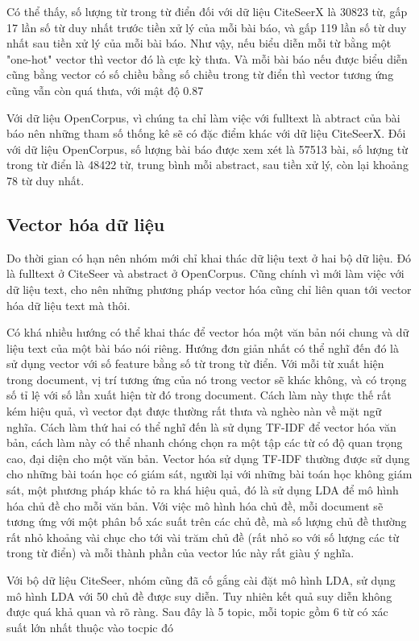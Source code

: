 \documentclass[12pt,a4paper]{article}
\begin{document}
Có thể thấy, số lượng từ trong từ điển đối với dữ liệu CiteSeerX là 30823 từ, gấp 17 lần số từ duy nhất trước tiền xử lý của mỗi bài báo, và gấp 119 lần số từ duy nhất sau tiền xử lý của mỗi bài báo. Như vậy, nếu biểu diễn mỗi từ bằng một "one-hot" vector thì vector đó là cực kỳ thưa. Và mỗi bài báo nếu được biểu diễn cũng bằng vector có số chiều bằng số chiều trong từ điển thì vector tương ứng cũng vẫn còn quá thưa, với mật độ 0.87%


Với dữ liệu OpenCorpus, vì chúng ta chỉ làm việc với fulltext là abtract của bài báo nên những tham số thống kê sẽ có đặc điểm khác với dữ liệu CiteSeerX. Đối với dữ liệu OpenCorpus, số lượng bài báo được xem xét là 57513 bài, số lượng từ trong từ điển là 48422 từ, trung bình mỗi abstract, sau tiền xử lý, còn lại khoảng 78 từ duy nhất.


\subsection{Vector hóa dữ liệu}
Do thời gian có hạn nên nhóm mới chỉ khai thác dữ liệu text ở hai bộ dữ liệu. Đó là fulltext ở CiteSeer và abstract ở OpenCorpus. Cũng chính vì mới làm việc với dữ liệu text, cho nên những phương pháp vector hóa cũng chỉ liên quan tới vector hóa dữ liệu text mà thôi.


Có khá nhiều hướng có thể khai thác để vector hóa một văn bản nói chung và dữ liệu text của một bài báo nói riêng. Hướng đơn giản nhất có thể nghĩ đến đó là sử dụng vector với số feature bằng số từ trong từ điển. Với mỗi từ xuất hiện trong document, vị trí tương ứng của nó trong vector sẽ khác không, và có trọng số tỉ lệ với số lần xuất hiện từ đó trong document. Cách làm này thực thế rất kém hiệu quả, vì vector đạt được thường rất thưa và nghèo nàn về mặt ngữ nghĩa. Cách làm thứ hai có thể nghĩ đến là sử dụng TF-IDF để vector hóa văn bản, cách làm này có thể nhanh chóng chọn ra một tập các từ có độ quan trọng cao, đại diện cho một văn bản. Vector hóa sử dụng TF-IDF thường được sử dụng cho những bài toán học có giám sát, người lại với những bài toán học không giám sát, một phương pháp khác tỏ ra khá hiệu quả, đó là sử dụng LDA để mô hình hóa chủ đề cho mỗi văn bản. Với việc mô hình hóa chủ đề, mỗi document sẽ tương ứng với một phân bố xác suất trên các chủ đề, mà số lượng chủ đề thường rất nhỏ khoảng vài chục cho tới vài trăm chủ đề (rất nhỏ so với số lượng các từ trong từ điển) và mỗi thành phần của vector lúc này rất giàu ý nghĩa. 



Với bộ dữ liệu CiteSeer, nhóm cũng đã cố gắng cài đặt mô hình LDA, sử dụng mô hình LDA với 50 chủ đề được suy diễn. Tuy nhiên kết quả suy diễn không được quá khả quan và rõ ràng. Sau đây là 5 topic, mỗi topic gồm 6 từ có xác suất lớn nhất thuộc vào tocpic đó
\end{document}
